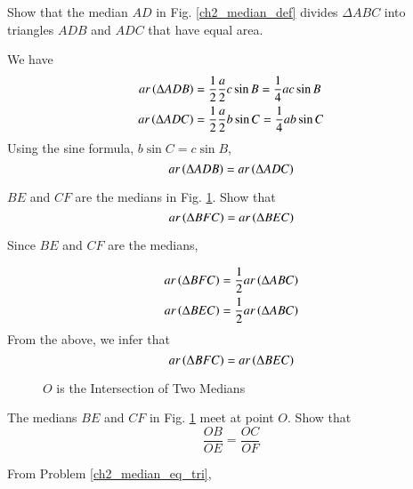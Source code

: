 \begin{problem}
	Show that the median $AD$ in Fig. \ref{ch2_median_def} divides  $\Delta ABC$ into triangles $ADB$ and $ADC$ that have equal area.
\end{problem}
\proof We have
%
\begin{align}
ar \left(\Delta ADB\right) &= \frac{1}{2}\frac{a}{2}c \sin B =  \frac{1}{4}ac \sin B \\
ar \left(\Delta ADC\right) &= \frac{1}{2}\frac{a}{2}b \sin C =  \frac{1}{4}ab \sin C 
\end{align}
%
Using the sine formula, $b \sin C = c \sin B$,
\begin{equation}
ar \left(\Delta ADB\right) = ar \left(\Delta ADC\right)
\end{equation}
\begin{problem}
	$BE$ and $CF$ are the medians in Fig. \ref{ch2_median_ratio}.  Show that
	\begin{equation}
	ar \left(\Delta BFC\right) = ar \left(\Delta BEC\right)
	\end{equation} 
	\label{ch2_median_eq_tri}
\end{problem}
\proof Since $BE$ and $CF$ are the medians, 

\begin{align}
ar \left(\Delta BFC\right) &= \frac{1}{2} ar \left(\Delta ABC\right) \\
ar \left(\Delta BEC\right) &= \frac{1}{2} ar \left(\Delta ABC\right) 
\end{align}
From the above, we infer that
%
\begin{equation}
ar \left(\Delta BFC\right) = ar \left(\Delta BEC\right)
\end{equation}


\begin{figure}[!ht]
	\begin{center}
		
		\resizebox{\columnwidth}{!}{}
	\end{center}
	\caption{$O$ is the Intersection of Two Medians}
	\label{ch2_median_ratio}	
\end{figure}
%
\begin{problem}
	The medians $BE$ and $CF$ in Fig. \ref{ch2_median_ratio} meet at point $O$.  Show that
	\begin{equation}
	\frac{OB}{OE} = \frac{OC}{OF} 
	\end{equation} 
\end{problem}
\proof From Problem \ref{ch2_median_eq_tri},

